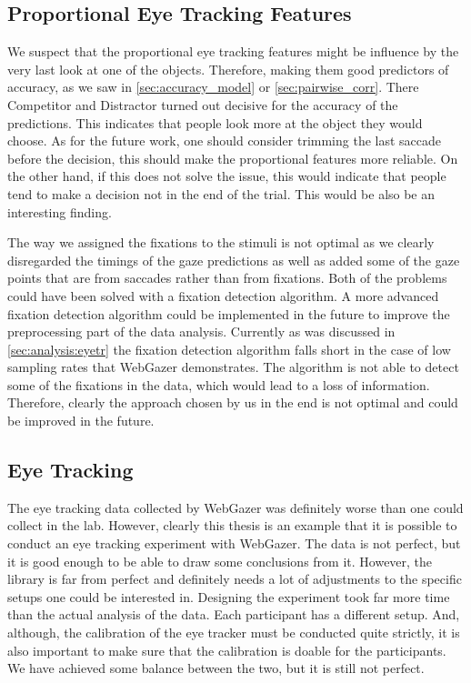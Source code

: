 \subsection{Proportional Eye Tracking Features}
\label{sec:general-discussion:proportional-eye-tracking-features}
We suspect that the proportional eye tracking features might be influence by the very last look at one of the objects. Therefore, making them good predictors of accuracy, as we saw in \autoref{sec:accuracy_model} or \autoref{sec:pairwise_corr}. There Competitor and Distractor turned out decisive for the accuracy of the predictions. This indicates that people look more at the object they would choose. As for the future work, one should consider trimming the last saccade before the decision, this should make the proportional features more reliable. On the other hand, if this does not solve the issue, this would indicate that people tend to make a decision not in the end of the trial. This would be also be an interesting finding.

The way we assigned the fixations to the stimuli is not optimal as we clearly disregarded the timings of the gaze predictions as well as added some of the gaze points that are from saccades rather than from fixations. Both of the problems could have been solved with a fixation detection algorithm. A more advanced fixation detection algorithm could be implemented in the future to improve the preprocessing part of the data analysis. Currently as was discussed in \autoref{sec:analysis:eyetr} the fixation detection algorithm falls short in the case of low sampling rates that WebGazer demonstrates. The algorithm is not able to detect some of the fixations in the data, which would lead to a loss of information. Therefore, clearly the approach chosen by us in the end is not optimal and could be improved in the future.

\subsection{Eye Tracking}
\label{sec:general-discussion:eye-tracking}
The eye tracking data collected by WebGazer was definitely worse than one could collect in the lab. However, clearly this thesis is an example that it is possible to conduct an eye tracking experiment with WebGazer. The data is not perfect, but it is good enough to be able to draw some conclusions from it. However, the library is far from perfect and definitely needs a lot of adjustments to the specific setups one could be interested in. Designing the experiment took far more time than the actual analysis of the data. Each participant has a different setup. And, although, the calibration of the eye tracker must be conducted quite strictly, it is also important to make sure that the calibration is doable for the participants. We have achieved some balance between the two, but it is still not perfect. 

